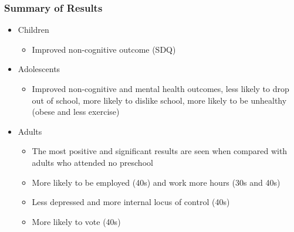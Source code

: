 \documentclass[static]{JJH-Beamer_PAGENOS}
\begin{document}
\begin{frame}
\frametitle{Summary of Results}
\begin{itemize}
	\item Children
	\begin{itemize}
		\item Improved non-cognitive outcome (SDQ)
	\end{itemize}
	\item Adolescents
	\begin{itemize}
		\item Improved non-cognitive and mental health outcomes, less likely to drop out of school, more likely to dislike school, more likely to be unhealthy (obese and less exercise)
	\end{itemize}
	\item Adults
		\begin{itemize}
		\item The most positive and significant results are seen when compared with adults who attended no preschool
		\item More likely to be employed (40s) and work more hours (30s and 40s)
		\item Less depressed and more internal locus of control (40s)
		\item More likely to vote (40s)
		\end{itemize}
\end{itemize}
\end{frame}

\end{document}

